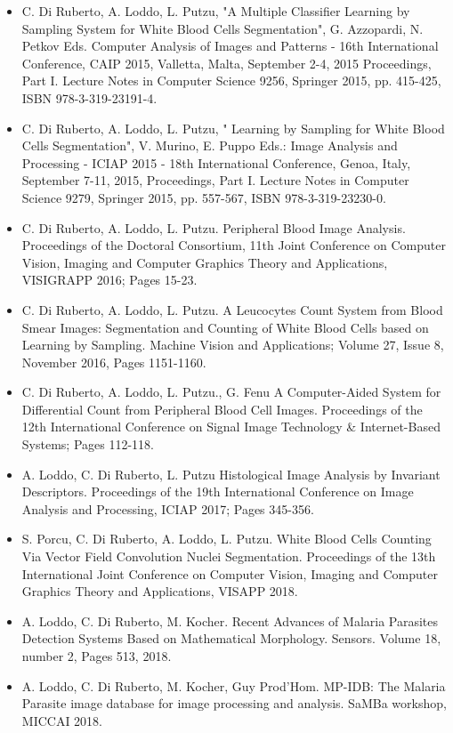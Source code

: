 \documentclass[final,a4paper,12pt,english]{UnicaPhdThesis3}
\begin{document}
	\begin{itemize}
		\item C. Di Ruberto, A. Loddo, L. Putzu, "A Multiple Classifier Learning by Sampling System for White Blood Cells Segmentation", G. Azzopardi, N. Petkov Eds. Computer Analysis of Images and Patterns - 16th International Conference, CAIP 2015, Valletta, Malta, September 2-4, 2015 Proceedings, Part I. Lecture Notes in Computer Science 9256, Springer 2015, pp. 415-425, ISBN 978-3-319-23191-4.
		\item C. Di Ruberto, A. Loddo, L. Putzu, " Learning by Sampling for White Blood Cells Segmentation", V. Murino, E. Puppo Eds.: Image Analysis and Processing - ICIAP 2015 - 18th International Conference, Genoa, Italy, September 7-11, 2015, Proceedings, Part I. Lecture Notes in Computer Science 9279, Springer 2015, pp. 557-567,  ISBN 978-3-319-23230-0. 
		\item C. Di Ruberto, A. Loddo, L. Putzu. Peripheral Blood Image Analysis. Proceedings of the Doctoral Consortium, 11th Joint Conference on Computer Vision, Imaging and Computer Graphics Theory and Applications, VISIGRAPP 2016; Pages 15-23.
		\item C. Di Ruberto, A. Loddo, L. Putzu. A Leucocytes Count System from Blood Smear Images: Segmentation and Counting of White Blood Cells based on Learning by Sampling. Machine Vision and Applications; Volume 27, Issue 8, November 2016, Pages 1151-1160.
		\item C. Di Ruberto, A. Loddo, L. Putzu., G. Fenu A Computer-Aided System for Differential Count from Peripheral Blood Cell Images. Proceedings of the 12th International Conference on Signal Image Technology \& Internet-Based Systems; Pages 112-118.
		\item A. Loddo, C. Di Ruberto, L. Putzu Histological Image Analysis by Invariant Descriptors. Proceedings of the 19th International Conference on Image Analysis and Processing, ICIAP 2017; Pages 345-356.
		\item S. Porcu, C. Di Ruberto, A. Loddo, L. Putzu. White Blood Cells Counting Via Vector Field Convolution Nuclei Segmentation. Proceedings of the 13th International Joint Conference on Computer Vision, Imaging and Computer Graphics Theory and Applications, VISAPP 2018.
		\item A. Loddo, C. Di Ruberto, M. Kocher. Recent Advances of Malaria Parasites Detection Systems Based on Mathematical Morphology. Sensors. Volume 18, number 2, Pages 513, 2018.
		\item A. Loddo, C. Di Ruberto, M. Kocher, Guy Prod'Hom. MP-IDB: The Malaria Parasite image database for image processing and analysis. SaMBa workshop, MICCAI 2018.
	\end{itemize}
	
\end{document}

